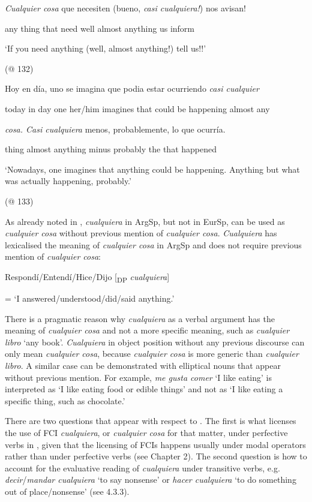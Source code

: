 \documentclass[output=paper]{langscibook}
\begin{document}
\label{bkm:Ref150786782}    \textit{Cualquier  cosa} que  necesiten  (bueno,  \textit{casi  cualquiera!}) nos  avisan!

    any  thing  that  need  well  almost  anything  us  inform

    ‘If you need anything (well, almost anything!) tell us!!’

    (@ 132)

\label{bkm:Ref150786875}    Hoy  en  día,  uno  se  imagina  que  podia  estar  ocurriendo  \textit{casi  cualquier}

    today  in  day  one  her/him  imagines  that  could  be  happening  almost  any

    \textit{cosa.  Casi  cualquiera} menos,  probablemente,  lo  que  ocurría.

    thing  almost  anything  minus  probably  the  that  happened

    ‘Nowadays, one imagines that anything could be happening. Anything but what was actually happening, probably.’

    (@ 133)

As already noted in , \textit{cualquiera} in ArgSp, but not in EurSp, can be used as \textit{cualquier cosa} without previous mention of \textit{cualquier cosa}. \textit{Cualquiera} has lexicalised the meaning of \textit{cualquier cosa} in ArgSp and does not require previous mention of \textit{cualquier cosa}:

\label{bkm:Ref150786811}    Respondí/Entendí/Hice/Dijo [\textsubscript{DP} \textit{cualquiera}] 

    = ‘I answered/understood/did/said anything.’

There is a pragmatic reason why \textit{cualquiera} as a verbal argument has the meaning of \textit{cualquier cosa} and not a more specific meaning, such as \textit{cualquier libro} ‘any book’. \textit{Cualquiera} in object position without any previous discourse can only mean \textit{cualquier cosa}, because \textit{cualquier cosa} is more generic than \textit{cualquier libro}. A similar case can be demonstrated with elliptical nouns that appear without previous mention. For example, \textit{me gusta comer} ‘I like eating’ is interpreted as ‘I like eating food or edible things’ and not as ‘I like eating a specific thing, such as chocolate.’

  There are two questions that appear with respect to . The first is what licenses the use of FCI \textit{cualquiera}, or \textit{cualquier cosa} for that matter, under perfective verbs in , given that the licensing of FCIs happens usually under modal operators rather than under perfective verbs (see Chapter 2). The second question is how to account for the evaluative reading of \textit{cualquiera} under transitive verbs, e.g. \textit{decir}/\textit{mandar cualquiera} ‘to say nonsense’ or \textit{hacer cualquiera} ‘to do something out of place/nonsense’ (see 4.3.3).
\end{document}
